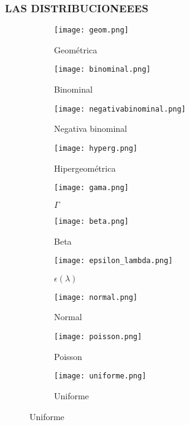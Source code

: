 \subsubsection{LAS DISTRIBUCIONEEES}
\begin{figure}[H]
	\begin{subfigure}{.5\textwidth}\centering
		\texttt{[image: geom.png]}
		\caption{Geométrica}
	\end{subfigure}\begin{subfigure}{.5\textwidth}\centering
		\texttt{[image: binominal.png]}
		\caption{Binominal}
	\end{subfigure}
	
	\begin{subfigure}{.5\textwidth}\centering
		\texttt{[image: negativabinominal.png]}
		\caption{Negativa binominal}
	\end{subfigure}\begin{subfigure}{.5\textwidth}\centering
		\texttt{[image: hyperg.png]}
		\caption{Hipergeométrica}
	\end{subfigure}
	
	\begin{subfigure}{.5\textwidth}\centering
		\texttt{[image: gama.png]}
		\caption{$\Gamma$}
	\end{subfigure}\begin{subfigure}{.5\textwidth}\centering
		\texttt{[image: beta.png]}
		\caption{Beta}
	\end{subfigure}
	
	\begin{subfigure}{.5\textwidth}\centering
		\texttt{[image: epsilon\_lambda.png]}
		\caption{$\epsilon(\lambda)$}
	\end{subfigure}\begin{subfigure}{.5\textwidth}\centering
		\texttt{[image: normal.png]}
		\caption{Normal}
	\end{subfigure}
	
	\begin{subfigure}{.5\textwidth}\centering
		\texttt{[image: poisson.png]}
		\caption{Poisson}
	\end{subfigure}\begin{subfigure}{.5\textwidth}\centering
		\texttt{[image: uniforme.png]}
		\caption{Uniforme}
	\end{subfigure}
\end{figure}